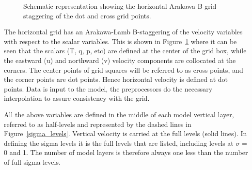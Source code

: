 \begin{figure}
\begin{center}
\caption{Schematic representation showing the horizontal Arakawa B-grid staggering
of the dot and cross grid points.}  \label{grid}
\end{center}
\end{figure}

The horizontal grid has an Arakawa-Lamb B-staggering of the velocity variables with 
respect to the scalar variables. This is shown in Figure~\ref{grid} where it can be seen that the scalars (T, q, p, etc) are defined at the center of the grid box, while the eastward (u) and 
northward (v) velocity components are collocated at the corners. The center points of 
grid squares will be referred to as cross points, and the corner points are dot points. 
Hence horizontal velocity is defined at dot points. Data is input to the model, the preprocessors do the necessary interpolation to assure consistency with the grid.

All the above variables are defined in the middle of each model vertical layer, referred 
to as half-levels and represented by the dashed lines in  Figure~\ref{sigma_levels}. Vertical velocity is carried at the full levels (solid lines). In defining the sigma levels it is the full levels that are listed, including levels at $\sigma$ = 0 and 1. The number of model layers is therefore always one less than the number of full sigma levels.

